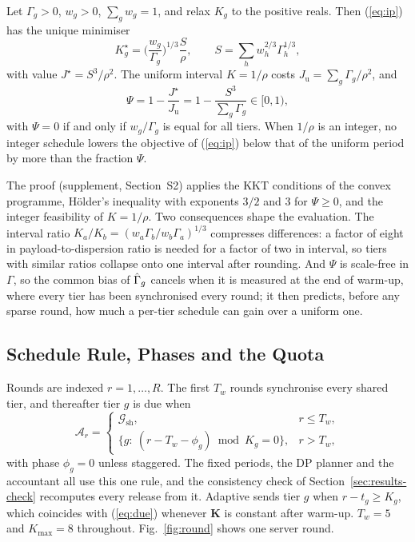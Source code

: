 \begin{proposition}
\label{prop:cuberoot}
Let $\Gamma_g>0$, $w_g>0$, $\sum_gw_g=1$, and relax $K_g$ to the positive reals. Then (\ref{eq:ip}) has the unique minimiser
\begin{equation}
K_g^\star=\Big(\frac{w_g}{\Gamma_g}\Big)^{1/3}\frac{S}{\rho},\qquad S=\sum_hw_h^{2/3}\Gamma_h^{1/3},
\label{eq:cuberoot}
\end{equation}
with value $J^\star=S^3/\rho^2$. The uniform interval $K=1/\rho$ costs $J_{\mathrm u}=\sum_g\Gamma_g/\rho^2$, and
\begin{equation}
\Psi=1-\frac{J^\star}{J_{\mathrm u}}=1-\frac{S^3}{\sum_g\Gamma_g}\in[0,1),
\label{eq:psi}
\end{equation}
with $\Psi=0$ if and only if $w_g/\Gamma_g$ is equal for all tiers. When $1/\rho$ is an integer, no integer schedule lowers the objective of (\ref{eq:ip}) below that of the uniform period by more than the fraction $\Psi$.
\end{proposition}
The proof (supplement, Section~S2) applies the KKT conditions of the convex programme, H\"older's inequality with exponents $3/2$ and $3$ for $\Psi\ge0$, and the integer feasibility of $K=1/\rho$. Two consequences shape the evaluation. The interval ratio $K_a/K_b=(w_a\Gamma_b/w_b\Gamma_a)^{1/3}$ compresses differences: a factor of eight in payload-to-dispersion ratio is needed for a factor of two in interval, so tiers with similar ratios collapse onto one interval after rounding. And $\Psi$ is scale-free in $\Gamma$, so the common bias of $\hat\Gamma_g$ cancels when it is measured at the end of warm-up, where every tier has been synchronised every round; it then predicts, before any sparse round, how much a per-tier schedule can gain over a uniform one.

\subsection{Schedule Rule, Phases and the Quota}
Rounds are indexed $r=1,\dots,R$. The first $T_w$ rounds synchronise every shared tier, and thereafter tier $g$ is due when
\begin{equation}
\mathcal A_r=\begin{cases}\mathcal G_{\mathrm{sh}}, & r\le T_w,\\ \{g:\ (r-T_w-\phi_g)\bmod K_g=0\}, & r>T_w,\end{cases}
\label{eq:due}
\end{equation}
with phase $\phi_g=0$ unless staggered. The fixed periods, the DP planner and the accountant all use this one rule, and the consistency check of Section~\ref{sec:results-check} recomputes every release from it. Adaptive \tierfed{} sends tier $g$ when $r-t_g\ge K_g$, which coincides with (\ref{eq:due}) whenever $\mathbf K$ is constant after warm-up. $T_w=5$ and $K_{\max}=8$ throughout. Fig.~\ref{fig:round} shows one server round.

